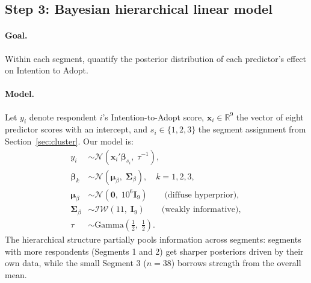\documentclass[11pt]{article}
\begin{document}
\subsection{Step 3: Bayesian hierarchical linear model}
\label{sec:hlm}

\paragraph{Goal.} Within each segment, quantify the posterior
distribution of each predictor's effect on Intention to Adopt.

\paragraph{Model.} Let $y_i$ denote respondent $i$'s Intention-to-Adopt
score, $\mathbf{x}_i \in \mathbb{R}^{9}$ the vector of eight predictor
scores with an intercept, and $s_i \in \{1, 2, 3\}$ the segment
assignment from Section~\ref{sec:cluster}. Our model is:
\begin{align}
  y_i                      &\sim \mathcal{N}(\mathbf{x}_i' \boldsymbol{\beta}_{s_i},\; \tau^{-1}), \\
  \boldsymbol{\beta}_k      &\sim \mathcal{N}(\boldsymbol{\mu}_\beta,\; \boldsymbol{\Sigma}_\beta),
                              \quad k = 1, 2, 3, \\
  \boldsymbol{\mu}_\beta    &\sim \mathcal{N}(\mathbf{0},\; 10^6 \mathbf{I}_9)
                              \qquad \text{(diffuse hyperprior)}, \\
  \boldsymbol{\Sigma}_\beta &\sim \mathcal{IW}(11,\; \mathbf{I}_9)
                              \qquad \text{(weakly informative)}, \\
  \tau                     &\sim \text{Gamma}(\tfrac{1}{2},\; \tfrac{1}{2}).
\end{align}
The hierarchical structure partially pools information across
segments: segments with more respondents (Segments 1 and 2) get
sharper posteriors driven by their own data, while the small
Segment 3 ($n = 38$) borrows strength from the overall mean.
\end{document}
